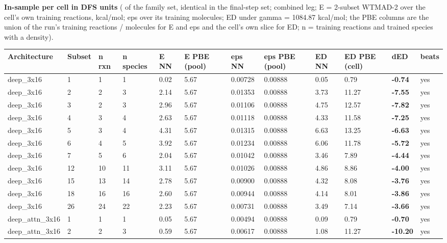\documentclass[10pt,a4paper]{article}
\begin{document}
\textbf{In-sample per cell in DFS units} ( of the family  set, identical in the final-step set; combined leg; E = 2-subset WTMAD-2 over the cell's own training reactions, kcal/mol; eps over its training molecules; ED under gamma = 1084.87 kcal/mol; the PBE columns are the union of the run's training reactions / molecules for E and eps and the cell's own slice for ED; n = training reactions and trained species with a density).

\begin{landscape}
\begin{footnotesize}
\begin{longtable}{llllllllllll}
\toprule Architecture & Subset & n rxn & n species & E NN & E PBE (pool) & eps NN & eps PBE (pool) & ED NN & ED PBE (cell) & dED & beats \\ \midrule \endhead
deep\_3x16 & 1 & 1 & 1 & 0.02 & 5.67 & 0.00728 & 0.00888 & 0.05 & 0.79 & \textbf{-0.74} & yes \\
deep\_3x16 & 2 & 2 & 3 & 2.14 & 5.67 & 0.01353 & 0.00888 & 3.73 & 11.27 & \textbf{-7.55} & yes \\
deep\_3x16 & 3 & 2 & 3 & 2.96 & 5.67 & 0.01106 & 0.00888 & 4.75 & 12.57 & \textbf{-7.82} & yes \\
deep\_3x16 & 4 & 3 & 4 & 2.63 & 5.67 & 0.01118 & 0.00888 & 4.33 & 11.58 & \textbf{-7.25} & yes \\
deep\_3x16 & 5 & 3 & 4 & 4.31 & 5.67 & 0.01315 & 0.00888 & 6.63 & 13.25 & \textbf{-6.63} & yes \\
deep\_3x16 & 6 & 4 & 5 & 3.92 & 5.67 & 0.01234 & 0.00888 & 6.06 & 11.78 & \textbf{-5.72} & yes \\
deep\_3x16 & 7 & 5 & 6 & 2.04 & 5.67 & 0.01042 & 0.00888 & 3.46 & 7.89 & \textbf{-4.44} & yes \\
deep\_3x16 & 12 & 10 & 11 & 3.11 & 5.67 & 0.01026 & 0.00888 & 4.86 & 8.86 & \textbf{-4.00} & yes \\
deep\_3x16 & 15 & 13 & 14 & 2.78 & 5.67 & 0.00900 & 0.00888 & 4.32 & 8.08 & \textbf{-3.76} & yes \\
deep\_3x16 & 18 & 16 & 16 & 2.60 & 5.67 & 0.00944 & 0.00888 & 4.14 & 8.01 & \textbf{-3.86} & yes \\
deep\_3x16 & 26 & 24 & 22 & 2.23 & 5.67 & 0.00731 & 0.00888 & 3.49 & 7.14 & \textbf{-3.66} & yes \\
deep\_attn\_3x16 & 1 & 1 & 1 & 0.05 & 5.67 & 0.00494 & 0.00888 & 0.09 & 0.79 & \textbf{-0.70} & yes \\
deep\_attn\_3x16 & 2 & 2 & 3 & 0.59 & 5.67 & 0.00617 & 0.00888 & 1.08 & 11.27 & \textbf{-10.20} & yes \\

\end{longtable}
\end{footnotesize}
\end{landscape}
\end{document}
